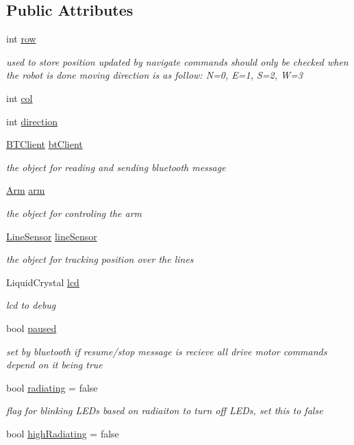 \subsection*{Public Attributes}
\begin{DoxyCompactItemize}
\item 
int \hyperlink{classRobot_a35ce5c416a079fcf6b943843ec151d63}{row}
\begin{DoxyCompactList}\small\item\em used to store position updated by navigate commands should only be checked when the robot is done moving direction is as follow\-: N=0, E=1, S=2, W=3 \end{DoxyCompactList}\item 
int \hyperlink{classRobot_a2e08d53491bb82defe2e28ee9ce1d096}{col}
\item 
int \hyperlink{classRobot_ac25b4dfc2e9e5aa86ec5684d075d32b8}{direction}
\item 
\hyperlink{classBTClient}{B\-T\-Client} \hyperlink{classRobot_a9da91e6d551ed02038e935b3c755cc75}{bt\-Client}
\begin{DoxyCompactList}\small\item\em the object for reading and sending bluetooth message \end{DoxyCompactList}\item 
\hyperlink{classArm}{Arm} \hyperlink{classRobot_a444673862cbe384992aceb066282b500}{arm}
\begin{DoxyCompactList}\small\item\em the object for controling the arm \end{DoxyCompactList}\item 
\hyperlink{classLineSensor}{Line\-Sensor} \hyperlink{classRobot_abdc300045bea9a31013b25682629752d}{line\-Sensor}
\begin{DoxyCompactList}\small\item\em the object for tracking position over the lines \end{DoxyCompactList}\item 
Liquid\-Crystal \hyperlink{classRobot_aa2182958e636a5b3e0383643a48ca6f8}{lcd}
\begin{DoxyCompactList}\small\item\em lcd to debug \end{DoxyCompactList}\item 
bool \hyperlink{classRobot_a6a1fae6e6ee0a3298b9e60d3f50ad12a}{paused}
\begin{DoxyCompactList}\small\item\em set by bluetooth if resume/stop message is recieve all drive motor commands depend on it being true \end{DoxyCompactList}\item 
bool \hyperlink{classRobot_a77f62d85ab1cf34e79c2a3acd470a4ce}{radiating} = false
\begin{DoxyCompactList}\small\item\em flag for blinking L\-E\-Ds based on radiaiton to turn off L\-E\-Ds, set this to false \end{DoxyCompactList}\item 
bool \hyperlink{classRobot_a52d4eac720f8d9afe84ebb5f4ea4a82e}{high\-Radiating} = false
\end{DoxyCompactItemize}
